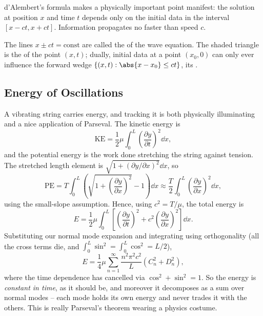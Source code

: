 d'Alembert's formula makes a physically important point manifest: the solution at position $x$ and time $t$ depends only on the initial data in the interval $[x - ct, x + ct]$. Information propagates no faster than speed $c$.

\begin{center}
\end{center}

The lines $x \pm ct = \text{const}$ are called the  of the wave equation. The shaded triangle is the  of the point $(x, t)$; dually, initial data at a point $(x_0, 0)$ can only ever influence the forward wedge $\{(x,t) : \abs{x - x_0} \leq ct\}$, its .

\subsection{Energy of Oscillations}

A vibrating string carries energy, and tracking it is both physically illuminating and a nice application of Parseval. The kinetic energy is
$$
\text{KE} = \frac{1}{2}\mu \int_0^L \left(\frac{\partial y}{\partial t}\right)^2 \dd x,
$$
and the potential energy is the work done stretching the string against tension. The stretched length element is $\sqrt{1 + (\partial y/\partial x)^2}\dd x$, so
$$
\text{PE} = T \int_0^L \left(\sqrt{1 + \left(\frac{\partial y}{\partial x}\right)^2} - 1\right) \dd x \approx \frac{T}{2} \int_0^L \left(\frac{\partial y}{\partial x}\right)^2 \dd x,
$$
using the small-slope assumption. Hence, using $c^2 = T/\mu$, the total energy is
$$
E = \frac{1}{2} \mu \int_0^L \left[\left(\frac{\partial y}{\partial t}\right)^2 + c^2 \left(\frac{\partial y}{\partial x}\right)^2\right] \dd x.
$$
Substituting our normal mode expansion and integrating using orthogonality (all the cross terms die, and $\int_0^L \sin^2 = \int_0^L \cos^2 = L/2$),
$$
E = \frac{1}{4} \mu \sum_{n = 1}^{\infty} \frac{n^2 \pi^2 c^2}{L}\left(C_n^2 + D_n^2\right),
$$
where the time dependence has cancelled via $\cos^2 + \sin^2 = 1$. So the energy is \emph{constant in time}, as it should be, and moreover it decomposes as a sum over normal modes -- each mode holds its own energy and never trades it with the others. This is really Parseval's theorem wearing a physics costume.

